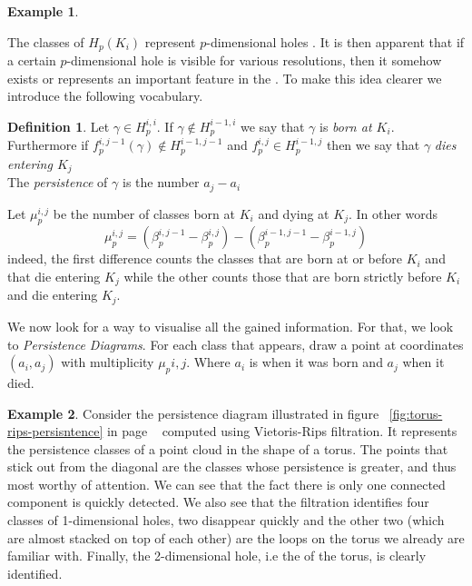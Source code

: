 \documentclass{article}
\theoremstyle{plain}
\theoremstyle{definition}
\newtheorem{definition}{Definition}[section]
\newtheorem{example}{Example}[section]
\theoremstyle{remark}
\begin{document}
\begin{example}
\end{example}

The classes of $H_p(K_i)$ represent $p$-dimensional holes . It is then apparent that if a certain $p$-dimensional hole is visible for various resolutions, then it somehow exists or represents an important feature in the . To make this idea clearer we introduce the following vocabulary.

\begin{definition}
Let $\gamma \in H_p^{i,i} $. If $\gamma \notin H_p^{i-1,i}$ we say that $\gamma$ is \emph{born at $K_i$}. \\
Furthermore if $f_p^{i,j-1}(\gamma) \notin H_p^{i-1,j-1}$ and $f_p^{i,j} \in H_p^{i-1,j}$ then we say that $\gamma$ \emph{dies entering $K_j$} \\
The \emph{persistence} of $\gamma$ is the number $a_j-a_i$
\end{definition}

Let $\mu_p^{i,j}$ be the number of classes born at $K_i$ and dying at $K_j$. In other words 
\[ \mu_p^{i,j} = \left( \beta_p^{i,j-1} - \beta_p^{i,j} \right) - \left( \beta_p^{i-1,j-1} - \beta_p^{i-1,j}  \right) \]
indeed, the first difference counts the classes that are born at or before $K_i$ and that die entering $K_j$ while the other counts those that are born strictly before $K_i$ and die entering $K_j$.

We now look for a way to visualise all the gained information. For that, we look to \emph{Persistence Diagrams}. For each class that appears, draw a point at coordinates $(a_i,a_j)$ with multiplicity $\mu_p{i,j}$. Where $a_i$ is when it was born and $a_j$ when it died.

\begin{example}
Consider the persistence diagram illustrated in figure ~\ref{fig:torus-rips-persisntence} in page ~\pageref{fig:torus-rips-persisntence} computed using Vietoris-Rips filtration. It represents the persistence classes of a point cloud in the shape of a torus. The points that stick out from the diagonal are the classes whose persistence is greater, and thus most worthy of attention. We can see that the fact there is only one connected component is quickly detected. We also see that the filtration identifies four classes of 1-dimensional holes, two disappear quickly and the other two (which are almost stacked on top of each other) are the loops on the torus we already are familiar with. Finally, the 2-dimensional hole, i.e the  of the torus, is clearly identified.
\end{example}
\end{document}
